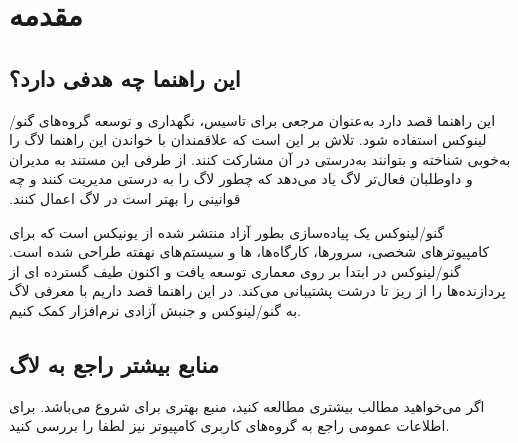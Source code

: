 \section{مقدمه}

\subsection{این راهنما چه هدفی دارد؟}

این راهنما قصد دارد به‌عنوان مرجعی برای تاسیس، نگهداری و توسعه گروه‌های گنو/لینوکس استفاده شود.
تلاش بر این است که علاقمندان با خواندن این راهنما لاگ را ‫به‌خوبی شناخته و بتوانند به‌درستی در آن
مشارکت کنند. از طرفی این مستند به مدیران و داوطلبان فعال‌تر لاگ یاد می‌دهد که چطور لاگ را به درستی
مدیریت کنند و چه قوانینی را بهتر است در لاگ اعمال کنند.

گنو/لینوکس یک پیاده‌سازی بطور آزاد منتشر شده از یونیکس است که برای کامپیوترهای شخصی،
سرورها، کارگاه‌ها، ‌ها و سیستم‌های نهفته طراحی شده است.
گنو/لینوکس در ابتدا بر روی معماری  توسعه یافت و اکنون طیف گسترده ای از پردازنده‌ها
را از ریز تا درشت پشتیبانی می‌کند. در این راهنما قصد داریم با معرفی لاگ به گنو/لینوکس و جنبش
آزادی نرم‌افزار کمک کنیم.

%

\subsection{منابع بیشتر راجع به لاگ}

اگر می‌خواهید مطالب بیشتری مطالعه کنید،
منبع بهتری برای شروع می‌باشد. برای اطلاعات عمومی راجع به گروه‌های کاربری کامپیوتر نیز لطفا
را بررسی کنید.


